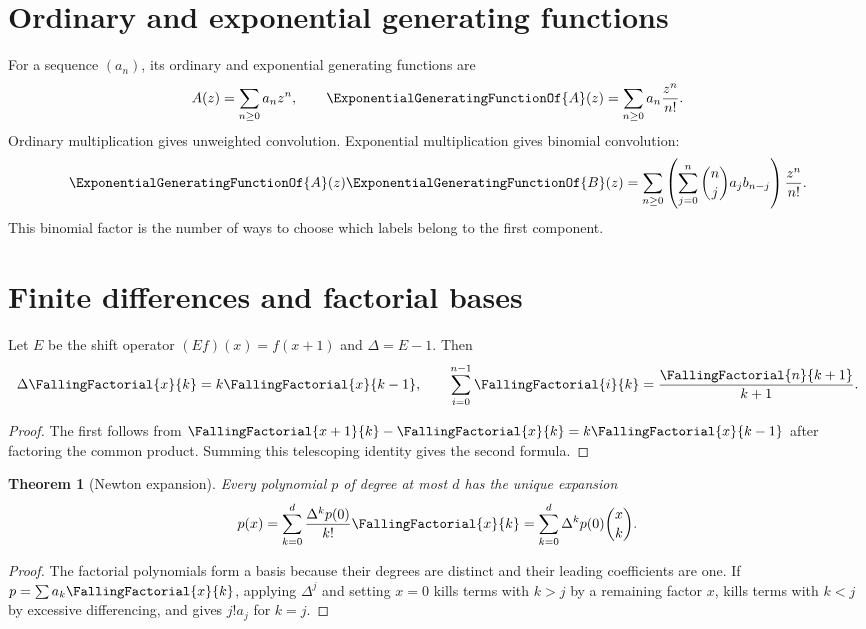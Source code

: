 \documentclass[11pt,a4paper,oneside,openany]{book}
\newtheorem{theorem}{Theorem}[chapter]
\theoremstyle{definition}
\theoremstyle{remark}
\begin{document}
\section{Ordinary and exponential generating functions}
For a sequence $(a_n)$, its ordinary and exponential generating functions are
\[
 A(z)=\sum_{n\ge0}a_nz^n,
 \qquad \ExponentialGeneratingFunctionOf{A}(z)=\sum_{n\ge0}a_n\frac{z^n}{n!}.
\]
Ordinary multiplication gives unweighted convolution.  Exponential multiplication
gives binomial convolution:
\begin{equation}\label{eq:egf-product}
 \ExponentialGeneratingFunctionOf{A}(z)\ExponentialGeneratingFunctionOf{B}(z)
 =\sum_{n\ge0}\left(\sum_{j=0}^n\binom nj a_jb_{n-j}\right)\frac{z^n}{n!}.
\end{equation}
This binomial factor is the number of ways to choose which labels belong to the
first component.

\section{Finite differences and factorial bases}
Let $E$ be the shift operator $(Ef)(x)=f(x+1)$ and
$\Delta=E-1$.  Then
\begin{equation}\label{eq:finite-diff-falling}
 \Delta\FallingFactorial{x}{k}=k\FallingFactorial{x}{k-1},
 \qquad
 \sum_{i=0}^{n-1}\FallingFactorial{i}{k}=\frac{\FallingFactorial{n}{k+1}}{k+1}.
\end{equation}
\begin{proof}
The first follows from
$\FallingFactorial{x+1}{k}-\FallingFactorial{x}{k}=k\FallingFactorial{x}{k-1}$ after factoring the common
product.  Summing this telescoping identity gives the second formula.
\end{proof}

\begin{theorem}[Newton expansion]\label{thm:newton-expansion}
Every polynomial $p$ of degree at most $d$ has the unique expansion
\begin{equation}\label{eq:newton-expansion}
 p(x)=\sum_{k=0}^d\frac{\Delta^kp(0)}{k!}\FallingFactorial{x}{k}
     =\sum_{k=0}^d\Delta^kp(0)\binom{x}{k}.
\end{equation}
\end{theorem}
\begin{proof}
The factorial polynomials form a basis because their degrees are distinct and their
leading coefficients are one.  If $p=\sum a_k\FallingFactorial{x}{k}$, applying $\Delta^j$
and setting $x=0$ kills terms with $k>j$ by a remaining factor $x$, kills terms
with $k<j$ by excessive differencing, and gives $j!a_j$ for $k=j$.
\end{proof}
\end{document}
